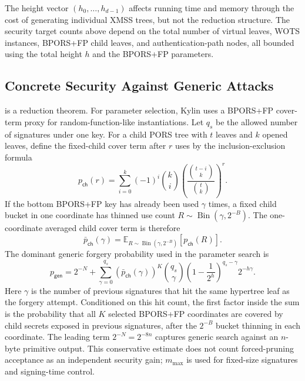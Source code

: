 \begin{remark}
The height vector $(h_0,\ldots,h_{d-1})$ affects running time and memory through
the cost of generating individual XMSS trees, but not the reduction structure.
The security target counts above depend on the total number of virtual leaves,
WOTS instances, BPORS+FP child leaves, and authentication-path nodes, all
bounded using the total height $h$ and the BPORS+FP parameters.
\end{remark}

\subsection{Concrete Security Against Generic Attacks}
\label{sec:proof-concrete}

 is a reduction theorem.  For parameter selection, Kylin
uses a BPORS+FP cover-term proxy for random-function-like instantiations.  Let
$q_s$ be the allowed number of signatures under one key.  For a child PORS tree
with $t$ leaves and $k$ opened leaves, define the fixed-child cover term after
$r$ uses by the inclusion-exclusion formula
\begin{equation}
\label{eq:proof-bpors-child-cover}
    p_{\mathsf{ch}}(r)
    =
    \sum_{i=0}^{k}(-1)^i\binom{k}{i}
    \left(\frac{\binom{t-i}{k}}{\binom{t}{k}}\right)^r .
\end{equation}
If the bottom BPORS+FP key has already been used $\gamma$ times, a fixed child
bucket in one coordinate has thinned use count
$R\sim\operatorname{Bin}(\gamma,2^{-B})$.  The one-coordinate averaged child
cover term is therefore
\begin{equation}
\label{eq:proof-bpors-thinned-cover}
    \bar p_{\mathsf{ch}}(\gamma)
    =
    \mathbb{E}_{R\sim\operatorname{Bin}(\gamma,2^{-B})}
    \left[p_{\mathsf{ch}}(R)\right].
\end{equation}
The dominant generic forgery probability used in the parameter search is
\begin{equation}
\label{eq:proof-generic-prob}
p_{\mathsf{gen}}
=2^{-N}
+\sum_{\gamma=0}^{q_s}
\left(\bar p_{\mathsf{ch}}(\gamma)\right)^K
\binom{q_s}{\gamma}
\left(1-\frac{1}{2^h}\right)^{q_s-\gamma}
2^{-h\gamma}.
\end{equation}
Here $\gamma$ is the number of previous signatures that hit the same hypertree
leaf as the forgery attempt.  Conditioned on this hit count, the first factor
inside the sum is the probability that all $K$ selected BPORS+FP coordinates
are covered by child secrets exposed in previous signatures, after the
$2^{-B}$ bucket thinning in each coordinate.  The leading term
$2^{-N}=2^{-8n}$ captures generic search against an $n$-byte primitive output.
This conservative estimate does not count forced-pruning acceptance as an
independent security gain; $m_{\max}$ is used for fixed-size signatures and
signing-time control.

